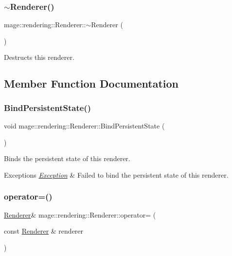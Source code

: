 \subsubsection{\texorpdfstring{$\sim$\+Renderer()}{~Renderer()}}
{\footnotesize\ttfamily mage\+::rendering\+::\+Renderer\+::$\sim$\+Renderer (\begin{DoxyParamCaption}{ }\end{DoxyParamCaption})\hspace{0.3cm}{\ttfamily [default]}}

Destructs this renderer. 

\subsection{Member Function Documentation}
\mbox{\label{classmage_1_1rendering_1_1_renderer_a7fa8fd234b69dabc51d7a214afb641b3}} 
\subsubsection{\texorpdfstring{Bind\+Persistent\+State()}{BindPersistentState()}}
{\footnotesize\ttfamily void mage\+::rendering\+::\+Renderer\+::\+Bind\+Persistent\+State (\begin{DoxyParamCaption}{ }\end{DoxyParamCaption})}

Binds the persistent state of this renderer.


\begin{DoxyExceptions}{Exceptions}
{\em \mbox{\hyperlink{classmage_1_1_exception}{Exception}}} & Failed to bind the persistent state of this renderer. \\
\hline
\end{DoxyExceptions}
\mbox{\label{classmage_1_1rendering_1_1_renderer_a23338d210ca0008a05cf060f35d4dc70}} 
\subsubsection{\texorpdfstring{operator=()}{operator=()}\hspace{0.1cm}{\footnotesize\ttfamily [1/2]}}
{\footnotesize\ttfamily \mbox{\hyperlink{classmage_1_1rendering_1_1_renderer}{Renderer}}\& mage\+::rendering\+::\+Renderer\+::operator= (\begin{DoxyParamCaption}\item[{const \mbox{\hyperlink{classmage_1_1rendering_1_1_renderer}{Renderer}} \&}]{renderer }\end{DoxyParamCaption})\hspace{0.3cm}{\ttfamily [delete]}}

